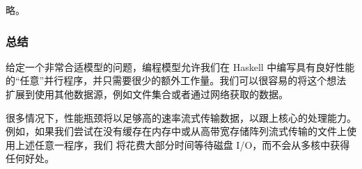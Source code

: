 \documentclass[./main.tex]{subfiles}
\begin{document}
略。

\subsubsection*{总结}

给定一个非常合适模型的问题，编程模型允许我们在 Haskell 中编写具有良好性能的“任意”并行程序，并只需要很少的额外工作量。我们可以很容易的将这个想法
扩展到使用其他数据源，例如文件集合或者通过网络获取的数据。

很多情况下，性能瓶颈将以足够高的速率流式传输数据，以跟上核心的处理能力。例如，如果我们尝试在没有缓存在内存中或从高带宽存储阵列流式传输的文件上使用上述任意一程序，我们
将花费大部分时间等待磁盘 I/O，而不会从多核中获得任何好处。
\end{document}
